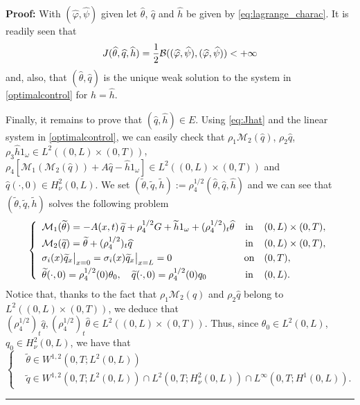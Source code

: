 \documentclass[10pt]{article}
\newenvironment{proof}[1][Proof]
{\noindent\textbf{#1:} }{\hfill\rule{0.5em}{0.5em}}
\def\dis{\displaystyle}
\def\om{\omega}
\def\\Phivec{\mathbf{\Phi}}
\begin{document}
\begin{proof}
	With $(\widehat{\varphi},\widehat{\psi})$ given let $\widehat{\theta}$, $\widehat{q}$ and $\widehat{h}$ be given by \eqref{eq:lagrange_charac}.
   	It is readily seen that
\begin{equation}\label{eq:Jhat}
	J(\widehat{\theta},\widehat{q},\widehat{h})={1\over2}\mathcal{B}((\widehat{\varphi},\widehat{\psi}),(\widehat{\varphi},\widehat{\psi}))<+\infty
\end{equation}
	and, also, that $(\widehat{\theta},\widehat{q})$ is the unique weak solution to the system in
	\eqref{optimalcontrol} for $h =\widehat{h}$.
	
	Finally, it remains to prove that $(\widehat q,\widehat h)\in E$. Using \eqref{eq:Jhat} and
	the linear system in \eqref{optimalcontrol}, we can easily check that $
	\rho_1\mathcal{M}_2(\widehat q)$, $\rho_2 \widehat q$, $\rho_3\widehat h1_\om\in L^2((0,L)\times(0,T))$,
		$\rho_4[\mathcal{M}_1(\mathcal{M}_2(\widehat q)) + A\widehat q -\widehat  h1_{\omega}]\in L^2((0,L)\times(0,T))$ and
		$\widehat q(\cdot,0)\in H^2_\nu(0,L)$. We set $(\tilde \theta,\tilde q,\tilde h):=\rho_4^{1/2}( \widehat \theta, \widehat q, \widehat h)$ and
		we can see that $(\widetilde \theta,\widetilde q,\widetilde h)$ solves the following problem
\begin{equation}\label{eq:tilde q}
\left\{
\begin{array}{lcl}
			\mathcal{M}_1(\widetilde\theta) = - A(x,t)\,\widetilde q+ \rho_4^{1/2} G+ \widetilde h1_{\omega} +(\rho_4^{1/2})_{t}\widehat \theta		&  \mbox{in}&	(0,L) \times (0,T),		\\
			\noalign{\smallskip}\dis
			\mathcal{M}_2(\widetilde q)  =  \widetilde \theta+(\rho_4^{1/2})_{t} \widehat q					&  \mbox{in}&	(0,L) \times (0,T),		\\
			\noalign{\smallskip}\dis
			\sigma_i(x)\widetilde q_{x}\big|_{x=0}=\sigma_i(x)\widetilde q_{x}\big|_{x=L} = 0				& \mbox{on}&	 (0,T),	\\
			\noalign{\smallskip}\dis
			\widetilde\theta(\cdot,0) =\rho_4^{1/2} (0)\theta_0,\quad \widetilde q(\cdot,0) =\rho_4^{1/2}(0) q_0 		& \mbox{in}&	(0,L).
\end{array}
\right.
\end{equation}
		Notice that, thanks to the fact that $\rho_1\mathcal{M}_2(\widehat q)$ and $\rho_2 \widehat q$
		belong to $L^2((0,L)\times(0,T))$,
	we deduce  that $(\rho_4^{1/2})_{t}\widehat q, (\rho_4^{1/2})_{t}\widehat \theta\in L^2((0,L)\times(0,T))$.
	Thus, since $\theta_0\in L^2(0,L)$, $ q_0\in H^2_\nu(0,L)$, we have that
\begin{equation}\label{reg_tilde}
\left\{
	\begin{alignedat}{2}
		&\widetilde\theta\in W^{1,2}(0,T;L^2(0,L))\\
		&\widetilde q \in W^{1,2}(0,T;L^2(0,L))\cap L^2(0,T;H^2_\nu(0,L))\cap L^\infty(0,T;H^1(0,L)).
	\end{alignedat}
	\right.
\end{equation}	
	

\end{proof}
\end{document}
